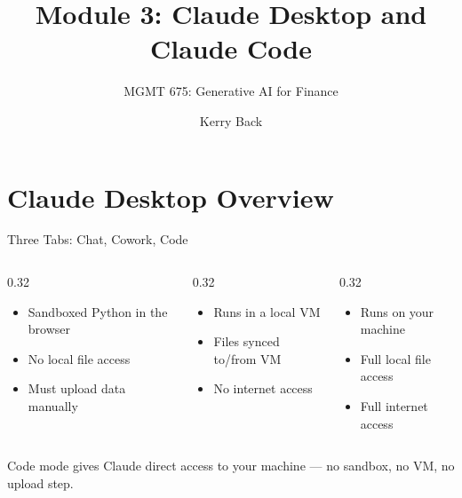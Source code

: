 \documentclass[aspectratio=169]{beamer}
\subtitle{MGMT 675: Generative AI for Finance}
\title{Module 3: Claude Desktop and Claude Code}
\author{Kerry Back}
\date{}
\begin{document}
\maketitle

\section{Claude Desktop Overview}

\begin{frame}{Three Tabs: Chat, Cowork, Code}
\begin{columns}[T]
\begin{column}{0.32\textwidth}
\begin{shadedbox}[title=\textbf{Chat (Analysis)}]
\begin{itemize}\footnotesize
  \item Sandboxed Python in the browser
  \item No local file access
  \item Must upload data manually
\end{itemize}
\end{shadedbox}
\end{column}
\begin{column}{0.32\textwidth}
\begin{shadedbox}[title=\textbf{Cowork}]
\begin{itemize}\footnotesize
  \item Runs in a local VM
  \item Files synced to/from VM
  \item \alert{No internet access}
\end{itemize}
\end{shadedbox}
\end{column}
\begin{column}{0.32\textwidth}
\begin{shadedbox}[title=\textbf{Code}]
\begin{itemize}\footnotesize
  \item Runs on \alert{your machine}
  \item Full local file access
  \item Full internet access
\end{itemize}
\end{shadedbox}
\end{column}
\end{columns}
\vspace{0.3cm}
\begin{center}
\alert{Code mode} gives Claude direct access to your machine --- no sandbox, no VM, no upload step.
\end{center}
\end{frame}
\end{document}
